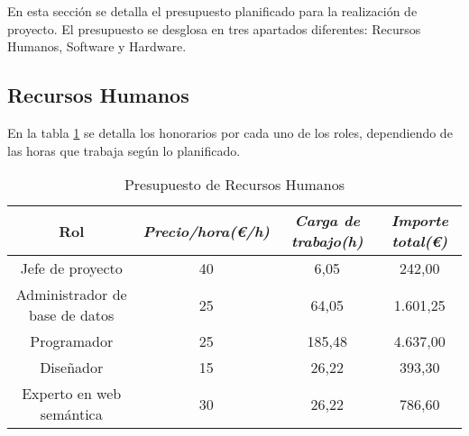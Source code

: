 En esta sección se detalla el presupuesto planificado para la realización de proyecto. El presupuesto se desglosa en tres apartados diferentes: Recursos Humanos, Software y Hardware.

\subsection{Recursos Humanos}

En la tabla \ref{tab:budget-human} se detalla los honorarios por cada uno de los roles, dependiendo de las horas que trabaja según lo planificado.

\begin{table}[htp]
	\centering
	\caption{Presupuesto de Recursos Humanos}\label{tab:budget-human}
	\begin{tabular}{cccc}
		\toprule
    	\textbf{Rol} & \emph{Precio/hora(\euro/h)} & \emph{Carga de trabajo(h)} & \emph{Importe total(\euro)}\\
    	\midrule
    	Jefe de proyecto				&	40			&	6,05 					& 	242,00\\
		Administrador de base de datos	&	25			&	64,05					&	1.601,25\\
		Programador						&	25			&	185,48					&	4.637,00\\
		Diseñador						&	15			&	26,22					&	393,30\\
		Experto en web semántica		&	30			&	26,22					&	786,60\\
    	\bottomrule
    \end{tabular}
\end{table}